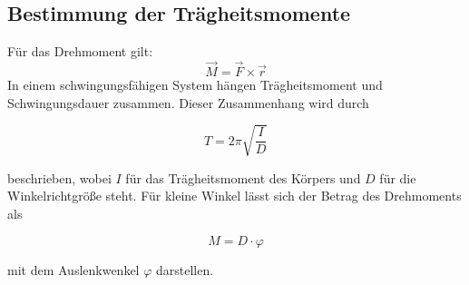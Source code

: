 \subsection{Bestimmung der Trägheitsmomente}
Für das Drehmoment gilt:
\begin{equation}
  \vec{M} = \vec{F} \times \vec{r}
  \label{eqn:6}
\end{equation}
In einem schwingungsfähigen System hängen Trägheitsmoment und Schwingungsdauer zusammen.
Dieser Zusammenhang wird durch

\begin{equation}
  T = 2\pi \sqrt{\frac{I}{D}}
  \label{eqn:7}
\end{equation}

beschrieben, wobei $I$ für das Trägheitsmoment des Körpers und $D$ für die
Winkelrichtgröße steht.
Für kleine Winkel lässt sich der Betrag des Drehmoments als

\begin{equation}
  M = D \cdot\varphi
  \label{eqn:8}
\end{equation}

mit dem Auslenkwenkel $\varphi$ darstellen.
